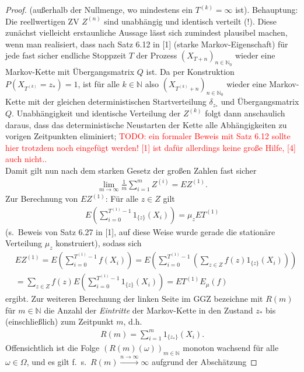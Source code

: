 \documentclass[twoside]{article}
\theoremstyle{definition}
\begin{document}
\begin{proof}
(außerhalb der Nullmenge, wo mindestens ein $T^{(k)} = \infty$ ist). Behauptung: Die reellwertigen ZV $Z^{(n)}$ sind unabhängig und identisch verteilt (!). Diese zunächst vielleicht erstaunliche Aussage lässt sich zumindest plausibel machen, wenn man realisiert, dass nach Satz 6.12 in [1] (starke Markov-Eigenschaft) für jede fast sicher endliche Stoppzeit $T$ der Prozess $(X_{T+n})_{n \in \mathbb{N}_0}$ wieder eine Markov-Kette mit Übergangsmatrix $Q$ ist. Da per Konstruktion $P(X_{T^{(k)}} = z_*)=1$, ist für alle $k \in \mathbb{N}$ also $(X_{T^{(k)}+n})_{n \in \mathbb{N}_0}$ wieder eine Markov-Kette mit der gleichen deterministischen Startverteilung $\delta_{z_*}$ und Übergangsmatrix $Q$. Unabhängigkeit und identische Verteilung der $Z^{(k)}$ folgt dann anschaulich daraus, dass das deterministische Neustarten der Kette alle Abhängigkeiten zu vorigen Zeitpunkten eliminiert; \textcolor{red}{TODO: ein formaler Beweis mit Satz 6.12 sollte hier trotzdem noch eingefügt werden! [1] ist dafür allerdings keine große Hilfe, [4] auch nicht..}\\
Damit gilt nun nach dem starken Gesetz der großen Zahlen fast sicher
\begin{align}
\lim_{m \to \infty} \frac{1}{m} \sum_{i=1}^m Z^{(i)} = EZ^{(1)}.
\end{align}
Zur Berechnung von $EZ^{(1)}$: Für alle $z \in Z$ gilt 
\begin{align}
E \left(\sum_{i=0}^{T^{(1)}-1} 1_{\{z\}}(X_i) \right) = \mu_z ET^{(1)}
\end{align}
(s.\ Beweis von Satz 6.27 in [1], auf diese Weise wurde gerade die stationäre Verteilung $\mu_z$ konstruiert), sodass sich
\begin{align}
&EZ^{(1)} = E \left(\sum_{i=0}^{T^{(1)}-1} f(X_i) \right) = E \left(\sum_{i=0}^{T^{(1)}-1} \left( \sum_{z \in Z} f(z) 1_{\{z\}}(X_i) \right)\right)\\
&=\sum_{z \in Z} f(z) E \left(\sum_{i=0}^{T^{(1)}-1} 1_{\{z\}}(X_i)  \right) = ET^{(1)} E_\mu(f)
\end{align}
ergibt. Zur weiteren Berechnung der linken Seite im GGZ bezeichne mit $R(m)$ für $m \in \mathbb{N}$ die Anzahl der \textit{Eintritte} der Markov-Kette in den Zustand $z_*$ bis (einschließlich) zum Zeitpunkt $m$, d.h.\
\begin{align}
R(m) = \sum_{i=1}^m 1_{\{z_*\}}(X_i).
\end{align}
Offensichtlich ist die Folge $(R(m)(\omega))_{m \in \mathbb{N}}$ monoton wachsend für alle $\omega \in \Omega$, und es gilt f.\ s.\ $R(m) \xrightarrow{n \to \infty} \infty$ aufgrund der Abschätzung 

\end{proof}
\end{document}
